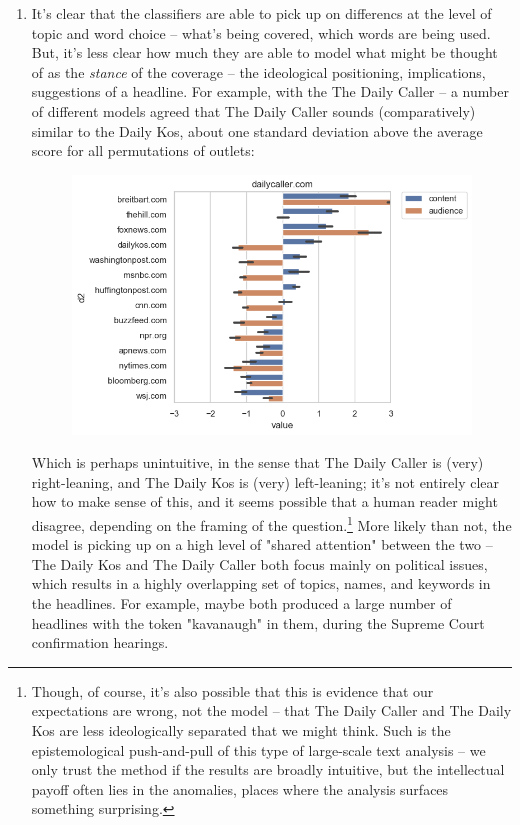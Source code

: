 \documentclass{scrartcl}
\begin{document}
\begin{enumerate}
\item It's clear that the classifiers are able to pick up on differencs at the level of topic and word choice -- what's being covered, which words are being used. But, it's less clear how much they are able to model what might be thought of as the \textit{stance} of the coverage -- the ideological positioning, implications, suggestions of a headline. For example, with the The Daily Caller -- a number of different models agreed that The Daily Caller sounds (comparatively) similar to the Daily Kos, about one standard deviation above the average score for all permutations of outlets:

\begin{figure}[H]
  \centering
  \includegraphics[width=\textwidth]{figures/ca-dailycaller-composite.png}
\end{figure}

Which is perhaps unintuitive, in the sense that The Daily Caller is (very) right-leaning, and The Daily Kos is (very) left-leaning; it's not entirely clear how to make sense of this, and it seems possible that a human reader might disagree, depending on the framing of the question.\footnote{Though, of course, it's also possible that this is evidence that our expectations are wrong, not the model -- that The Daily Caller and The Daily Kos are less ideologically separated that we might think. Such is the epistemological push-and-pull of this type of large-scale text analysis -- we only trust the method if the results are broadly intuitive, but the intellectual payoff often lies in the anomalies, places where the analysis surfaces something surprising.} More likely than not, the model is picking up on a high level of "shared attention" between the two -- The Daily Kos and The Daily Caller both focus mainly on political issues, which results in a highly overlapping set of topics, names, and keywords in the headlines. For example, maybe both produced a large number of headlines with the token "kavanaugh" in them, during the Supreme Court confirmation hearings.


\end{enumerate}
\end{document}
